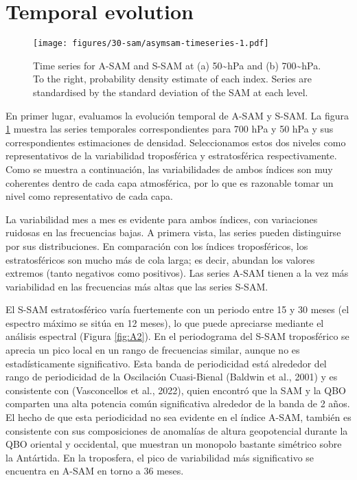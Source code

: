 \documentclass[12pt,oneside]{reedthesis}
\begin{document}
\hypertarget{temporal}{%
\section{Temporal evolution}\label{temporal}}
\begin{figure}
\centering
\texttt{[image: figures/30-sam/asymsam-timeseries-1.pdf]}
\caption{\label{fig:asymsam-timeseries}Time series for A-SAM and S-SAM at (a) 50\textasciitilde hPa and (b) 700\textasciitilde hPa. To the right, probability density estimate of each index. Series are standardised by the standard deviation of the SAM at each level.}
\end{figure}
En primer lugar, evaluamos la evolución temporal de A\nobreakdash-SAM y S\nobreakdash-SAM.
La figura \ref{fig:asymsam-timeseries} muestra las series temporales correspondientes para 700 hPa y 50 hPa y sus correspondientes estimaciones de densidad.
Seleccionamos estos dos niveles como representativos de la variabilidad troposférica y estratosférica respectivamente.
Como se muestra a continuación, las variabilidades de ambos índices son muy coherentes dentro de cada capa atmosférica, por lo que es razonable tomar un nivel como representativo de cada capa.

La variabilidad mes a mes es evidente para ambos índices, con variaciones ruidosas en las frecuencias bajas.
A primera vista, las series pueden distinguirse por sus distribuciones.
En comparación con los índices troposféricos, los estratosféricos son mucho más de cola larga; es decir, abundan los valores extremos (tanto negativos como positivos).
Las series A\nobreakdash-SAM tienen a la vez más variabilidad en las frecuencias más altas que las series S\nobreakdash-SAM.

El S\nobreakdash-SAM estratosférico varía fuertemente con un periodo entre 15 y 30 meses (el espectro máximo se sitúa en 12 meses), lo que puede apreciarse mediante el análisis espectral (Figura \ref{fig:A2}).
En el periodograma del S\nobreakdash-SAM troposférico se aprecia un pico local en un rango de frecuencias similar, aunque no es estadísticamente significativo.
Esta banda de periodicidad está alrededor del rango de periodicidad de la Oscilación Cuasi-Bienal (Baldwin et al., 2001) y es consistente con (Vasconcellos et al., 2022), quien encontró que la SAM y la QBO comparten una alta potencia común significativa alrededor de la banda de 2 años.
El hecho de que esta periodicidad no sea evidente en el índice A\nobreakdash-SAM, también es consistente con sus composiciones de anomalías de altura geopotencial durante la QBO oriental y occidental, que muestran un monopolo bastante simétrico sobre la Antártida.
En la troposfera, el pico de variabilidad más significativo se encuentra en A\nobreakdash-SAM en torno a 36 meses.
\end{document}
